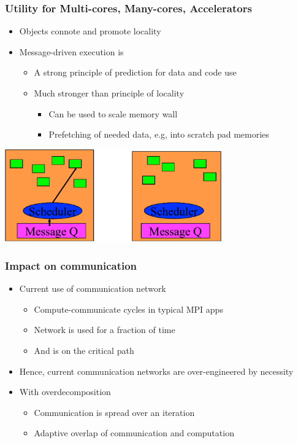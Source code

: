 \begin{frame}[t]
\frametitle{Utility for Multi-cores, Many-cores, Accelerators}
  \begin{itemize}
    \item Objects connote and promote locality
    \item Message-driven execution is
    \begin{itemize}
      \item A strong principle of prediction for data and code use
      \item Much stronger than principle of locality
      \begin{itemize}
        \item Can be used to scale memory wall
        \item Prefetching of needed data, e.g, into scratch pad memories
      \end{itemize}
    \end{itemize}
  \end{itemize}
  \begin{center} \includegraphics[width=0.7\textwidth]{figures/scheduler} \end{center}
\end{frame}

\begin{frame}[t]
\frametitle{Impact on communication}
  \begin{itemize}
    \item Current use of communication network
    \begin{itemize}
      \item Compute-communicate cycles in typical MPI apps
      \item Network is used for a fraction of time
      \item And is on the critical path
    \end{itemize}
    \pause
    \item Hence, current communication networks are over-engineered by necessity
    \pause
    \item With overdecomposition
    \begin{itemize}
      \item Communication is spread over an iteration
      \item Adaptive overlap of communication and computation
    \end{itemize}
  \end{itemize}
\end{frame}

